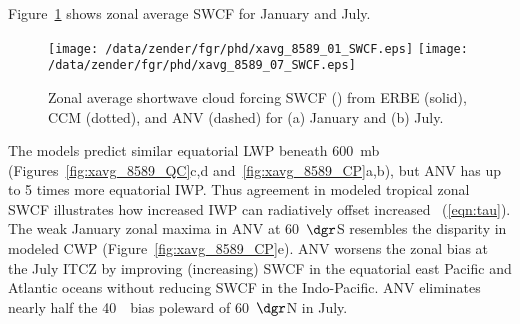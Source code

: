 \documentclass[agums]{aguplus}
\begin{document}
Figure~\ref{fig:xavg_8589_SWCF} shows zonal average SWCF for January
and July. 
\begin{figure}
\begin{center}
\texttt{[image: /data/zender/fgr/phd/xavg\_8589\_01\_SWCF.eps]}\vfill
\texttt{[image: /data/zender/fgr/phd/xavg\_8589\_07\_SWCF.eps]}\vfill
\end{center}
\caption[Zonal average shortwave cloud forcing SWCF from ERBE,
CCM, and ANV for January and July]{ 
Zonal average shortwave cloud forcing SWCF (\wxmS) from ERBE
(solid), CCM (dotted), and ANV (dashed) for (a) January and (b) July.
\label{fig:xavg_8589_SWCF}}   
\end{figure}
The models predict similar equatorial LWP beneath 600~mb 
(Figures~\ref{fig:xavg_8589_QC}c,d and~\ref{fig:xavg_8589_CP}a,b),
but ANV has up to 5 times more equatorial IWP.
Thus agreement in modeled tropical zonal SWCF illustrates how
increased IWP can radiatively offset increased \rdsffc\ (\ref{eqn:tau}).
The weak January zonal maxima in ANV at 60~$\dgr$S resembles the
disparity in modeled CWP (Figure~\ref{fig:xavg_8589_CP}e).
ANV worsens the zonal bias at the July ITCZ by improving (increasing)
SWCF in the equatorial east Pacific and Atlantic oceans without
reducing SWCF in the Indo-Pacific.
ANV eliminates nearly half the 40~\wxmS\ bias poleward of
60~$\dgr$N in July.
\end{document}
